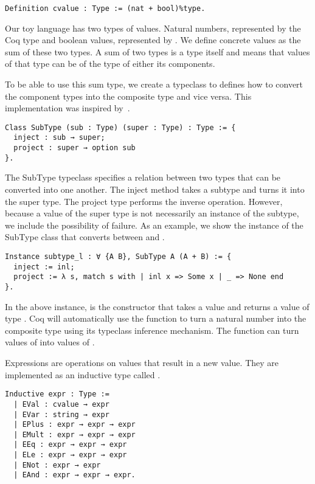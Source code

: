 \begin{verbatim}
Definition cvalue : Type := (nat + bool)%type.
\end{verbatim}

Our toy language has two types of values. Natural numbers, represented by
the Coq type  and boolean values, represented by . We
define concrete values as the sum of these two types. A sum of two types is a
type itself and means that values of that type can be of the type of either
its components.

To be able to use this sum type, we create a typeclass to defines how to
convert the component types into the composite type and vice versa. This
implementation was inspired by~\cite{liang1995monad}.

\begin{verbatim}
Class SubType (sub : Type) (super : Type) : Type := {
  inject : sub → super;
  project : super → option sub
}.
\end{verbatim}

The SubType typeclass specifies a relation between two types that can be
converted into one another. The inject method takes a subtype and turns it into
the super type. The project type performs the inverse operation. However,
because a value of the super type is not necessarily an instance of the
subtype, we include the possibility of failure. As an example, we show the
instance of the SubType class that converts between  and .

\begin{verbatim}
Instance subtype_l : ∀ {A B}, SubType A (A + B) := {
  inject := inl;
  project := λ s, match s with | inl x => Some x | _ => None end
}.
\end{verbatim}

In the above instance,  is the constructor that takes a value  and returns a value of type . Coq will automatically use the
 function to turn a natural number into the composite type  using
its typeclass inference mechanism. The  function can turn values
of  into values of . 

Expressions are operations on values that result in a new value. They are
implemented as an inductive type called . 

\begin{listing}
\begin{verbatim}
Inductive expr : Type :=
  | EVal : cvalue → expr
  | EVar : string → expr
  | EPlus : expr → expr → expr
  | EMult : expr → expr → expr
  | EEq : expr → expr → expr
  | ELe : expr → expr → expr
  | ENot : expr → expr
  | EAnd : expr → expr → expr.
\end{verbatim}
\end{listing}

